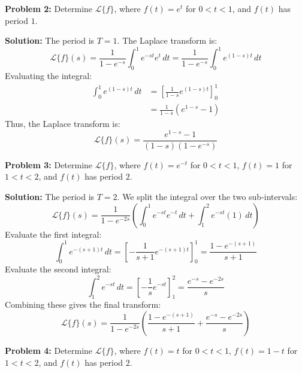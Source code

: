 \documentclass[11pt, letterpaper]{article}
\theoremstyle{definition}
\theoremstyle{remark}
\begin{document}
\vspace{1em}
\textbf{Problem 2:} Determine $\mathcal{L}\{f\}$, where $f(t) = e^t$ for $0 < t < 1$, and $f(t)$ has period $1$.

\textbf{Solution:}
The period is $T = 1$. The Laplace transform is:
\[ \mathcal{L}\{f\}(s) = \frac{1}{1 - e^{-s}} \int_0^1 e^{-st} e^t \, dt = \frac{1}{1 - e^{-s}} \int_0^1 e^{(1-s)t} \, dt \]
Evaluating the integral:
\begin{align*}
    \int_0^1 e^{(1-s)t} \, dt &= \left[ \frac{1}{1-s} e^{(1-s)t} \right]_0^1 \\
    &= \frac{1}{1-s} \left( e^{1-s} - 1 \right)
\end{align*}
Thus, the Laplace transform is:
\[ \mathcal{L}\{f\}(s) = \frac{e^{1-s} - 1}{(1-s)(1 - e^{-s})} \]

\vspace{1em}
\textbf{Problem 3:} Determine $\mathcal{L}\{f\}$, where $f(t) = e^{-t}$ for $0 < t < 1$, $f(t) = 1$ for $1 < t < 2$, and $f(t)$ has period $2$.

\textbf{Solution:}
The period is $T = 2$. We split the integral over the two sub-intervals:
\[ \mathcal{L}\{f\}(s) = \frac{1}{1 - e^{-2s}} \left( \int_0^1 e^{-st} e^{-t} \, dt + \int_1^2 e^{-st} (1) \, dt \right) \]
Evaluate the first integral:
\[ \int_0^1 e^{-(s+1)t} \, dt = \left[ -\frac{1}{s+1} e^{-(s+1)t} \right]_0^1 = \frac{1 - e^{-(s+1)}}{s+1} \]
Evaluate the second integral:
\[ \int_1^2 e^{-st} \, dt = \left[ -\frac{1}{s} e^{-st} \right]_1^2 = \frac{e^{-s} - e^{-2s}}{s} \]
Combining these gives the final transform:
\[ \mathcal{L}\{f\}(s) = \frac{1}{1 - e^{-2s}} \left( \frac{1 - e^{-(s+1)}}{s+1} + \frac{e^{-s} - e^{-2s}}{s} \right) \]

\vspace{1em}
\textbf{Problem 4:} Determine $\mathcal{L}\{f\}$, where $f(t) = t$ for $0 < t < 1$, $f(t) = 1-t$ for $1 < t < 2$, and $f(t)$ has period $2$.
\end{document}
